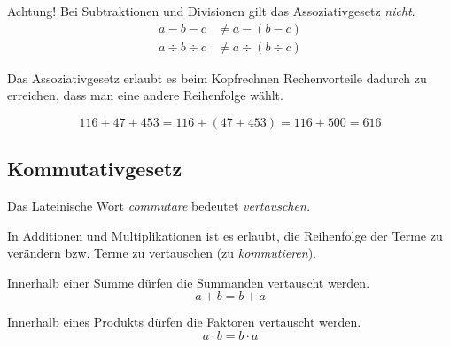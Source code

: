 Achtung! Bei Subtraktionen und Divisionen gilt das Assoziativgesetz \emph{nicht}.
\begin{align*}
 a-b-c &\ne a-(b-c)\\
 a\div b \div c &\ne a\div (b \div c)
\end{align*}

Das Assoziativgesetz erlaubt es beim Kopfrechnen Rechenvorteile dadurch zu erreichen, dass man eine andere Reihenfolge wählt.

\begin{bsp}
 \[116 + 47 + 453  = 116 + (47+453) = 116 + 500 = 616\] 
\end{bsp}


\subsection*{Kommutativgesetz}
\label{ssec:komm}

Das Lateinische Wort \emph{commutare} bedeutet \emph{vertauschen.}

\begin{center}
\end{center}

In Additionen und Multiplikationen ist es erlaubt, die Reihenfolge der Terme zu verändern bzw. Terme zu vertauschen (zu \emph{kommutieren}).

\begin{regel}
 Innerhalb einer Summe dürfen die Summanden vertauscht werden.
 \[a+b = b+a\]
\end{regel}

\begin{regel}
 Innerhalb eines Produkts dürfen die Faktoren vertauscht werden.
 \[a\cdot b = b \cdot a\]
\end{regel}


